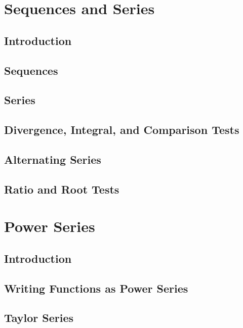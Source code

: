 \documentclass[symmetric,justified,marginals=justified,notoc]{tufte-book}
\theoremstyle{mytheoremstyle}
\begin{document}
	
\chapter{Sequences and Series}

	\section{Introduction}
	\lipsum[31-50]
	
	\section{Sequences}
	\lipsum[31-50]
	
	\section{Series}
	\lipsum[31-50]

	\section{Divergence, Integral, and Comparison Tests}
	\lipsum[31-50]	
	
	\section{Alternating Series}
	\lipsum[31-50]
	
	\section{Ratio and Root Tests}
	\lipsum[31-50]
	
	
\chapter{Power Series}

	\section{Introduction}
	\lipsum[31-50]
	
	\section{Writing Functions as Power Series}
	\lipsum[31-50]
	
	\section{Taylor Series}
	\lipsum[31-50]
	
\end{document}
